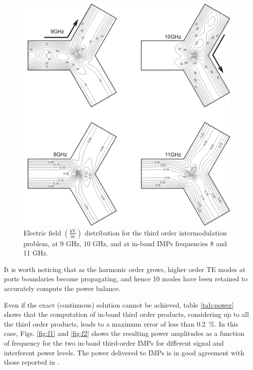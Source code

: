 \begin{figure}[!ht]
\centering
\includegraphics[width=14.4cm]{nlfield}
\caption{Electric field $\left(\frac{\mathrm{kV}}{\mathrm{m}}\right)$ distribution for the third order intermodulation problem, at 9 GHz, 10 GHz, and at in-band IMPs frequencies 8 and 11 GHz.}
\label{fig:nlfield}
\end{figure}

It is worth noticing that as the harmonic order grows, higher order TE modes at ports boundaries become propagating, and hence 10 modes \cite{pelosi2009quick} have been retained to accurately compute the power balance.


Even if the exact (continuous) solution cannot be achieved, table \ref{tab:power} shows that the computation of in-band third order products, considering up to all the third order products, leads to a maximum error of less than 0.2~\%. In this case, Figs. \ref{fig:f1} and \ref{fig:f2} shows the resulting power amplitudes as a function of frequency for the two in-band third-order IMPs for different signal and interferent power levels. The power delivered to IMPs is in good agreement with those reported in \cite{how1997nonlinear}.

